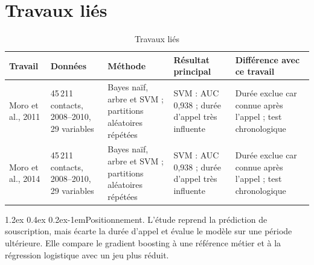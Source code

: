 \documentclass[11pt,a4paper]{article}
\makeatletter
\renewcommand\paragraph{\@startsection{paragraph}{4}{\z@}%
  {1.2ex \@plus 0.4ex \@minus 0.2ex}{-1em}{\normalfont\normalsize\bfseries}}
\makeatother
\begin{document}
\section{Travaux liés}
\label{sec:travaux}
\begin{table}[htbp]
  \centering
  \caption{Travaux liés}
  \label{tab:travaux}
  \small
  \begin{tabular}{@{}P{2.4cm} P{2.8cm} P{2.8cm} P{3.4cm} P{3.8cm}@{}}
    \toprule
    Travail & Données & Méthode & Résultat principal & Différence avec ce travail \\
    \midrule
    Moro et al., 2011 \cite{lie1} & 45\,211 contacts, 2008--2010, 29 variables & Bayes naïf, arbre et SVM ; partitions aléatoires répétées & SVM : AUC 0,938 ; durée d'appel très influente & Durée exclue car connue après l'appel ; test chronologique \\
    Moro et al., 2014 \cite{lie2} & 45\,211 contacts, 2008--2010, 29 variables & Bayes naïf, arbre et SVM ; partitions aléatoires répétées & SVM : AUC 0,938 ; durée d'appel très influente & Durée exclue car connue après l'appel ; test chronologique \\
    \bottomrule
  \end{tabular}
\end{table}

\paragraph{Positionnement.} L'étude reprend la prédiction de souscription, mais écarte la durée d'appel et évalue le modèle sur une période ultérieure. Elle compare le gradient boosting à une référence métier et à la régression logistique avec un jeu plus réduit.

\end{document}
